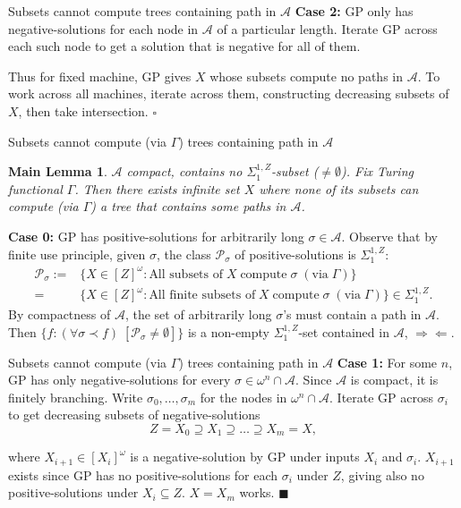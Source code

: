 \begin{frame}{Subsets cannot compute trees containing path in $\mathcal{A}$}
  \textbf{Case 2:} GP only has negative-solutions for each node in
  $\mathcal{A}$ of a particular length. Iterate GP across each such node to
  get a solution that is negative for all of them.

  \vspace{1em}
  Thus for fixed machine, GP gives $X$ whose subsets compute no paths in
  $\mathcal{A}$. To work across all machines, iterate across them,
  constructing decreasing subsets of $X$, then take intersection. $\square$
\end{frame}

\begin{frame}{Subsets cannot compute (via $\Gamma$) trees containing path
in $\mathcal{A}$}
  \newtheorem*{main-lemma*}{Main Lemma}
  \begin{main-lemma*}
    \label{lemma:fixed-machine}
    $\mathcal{A}$ compact, contains no $\Sigma_1^{1,Z}$-subset
    ($\neq\emptyset$). Fix Turing functional $\Gamma$. Then there exists
    infinite set $X$ where none of its subsets can compute (via $\Gamma$) a
    tree that contains some paths in $\mathcal{A}$.
  \end{main-lemma*}

  \vspace{0.5em}
  \textbf{Case 0:} GP has positive-solutions for arbitrarily long
  $\sigma\in\mathcal{A}$. Observe that by finite use principle, given
  $\sigma$, the class $\mathcal{P}_{\sigma}$ of positive-solutions is
  $\Sigma_1^{1,Z}$:
  \begin{align*}
    \mathcal{P}_{\sigma}:= &\{X\in[Z]^\omega: \text{All subsets of}\; X\;
      \text{compute}\; \sigma\; (\text{via}\; \Gamma)\}\\
    =&\{X\in[Z]^\omega: \text{All finite subsets of}\; X\;
      \text{compute}\; \sigma\; (\text{via}\; \Gamma)\}
      \in\Sigma_1^{1,Z}.
  \end{align*}
  By compactness of $\mathcal{A}$, the set of arbitrarily long $\sigma$'s
  must contain a path in $\mathcal{A}$. Then $\{f:(\forall \sigma\prec f)\;
  [\mathcal{P}_\sigma \neq \emptyset]\}$ is a non-empty
  $\Sigma_1^{1,Z}$-set contained in $\mathcal{A}$, $\Rightarrow\Leftarrow$.
\end{frame}

\begin{frame}{Subsets cannot compute (via $\Gamma$) trees containing path
in $\mathcal{A}$}
  \textbf{Case 1:} For some $n$, GP has only negative-solutions for every
  $\sigma\in\omega^n\cap\mathcal{A}$. Since $\mathcal{A}$ is compact, it is
  finitely branching. Write $\sigma_0,\ldots,\sigma_m$ for the
  nodes in $\omega^n\cap\mathcal{A}$. Iterate GP across $\sigma_i$ to get
  decreasing subsets of negative-solutions
  \[Z=X_0 \supseteq X_1 \supseteq \ldots\supseteq X_m=X,\]

  where $X_{i+1}\in[X_i]^\omega$ is a negative-solution by GP under
  inputs $X_i$ and $\sigma_i$. $X_{i+1}$ exists since GP has no
  positive-solutions for each $\sigma_i$ under $Z$, giving also no
  positive-solutions under $X_i\subseteq Z$. $X=X_m$ works. $\blacksquare$
\end{frame}


